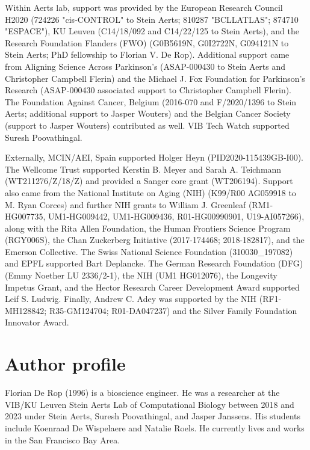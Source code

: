 Within Aerts lab, support was provided by the European Research Council H2020 (724226 "cis-CONTROL" to Stein Aerts; 810287 "BCLLATLAS"; 874710 "ESPACE"), KU Leuven (C14/18/092 and C14/22/125 to Stein Aerts), and the Research Foundation Flanders (FWO) (G0B5619N, G0I2722N, G094121N to Stein Aerts; PhD fellowship to Florian V. De Rop). Additional support came from Aligning Science Across Parkinson's (ASAP-000430 to Stein Aerts and Christopher Campbell Flerin) and the Michael J. Fox Foundation for Parkinson's Research (ASAP-000430 associated support to Christopher Campbell Flerin). The Foundation Against Cancer, Belgium (2016-070 and F/2020/1396 to Stein Aerts; additional support to Jasper Wouters) and the Belgian Cancer Society (support to Jasper Wouters) contributed as well. VIB Tech Watch supported Suresh Poovathingal.

\begingroup
{}
Externally, MCIN/AEI, Spain supported Holger Heyn (PID2020-115439GB-I00). The Wellcome Trust supported Kerstin B. Meyer and Sarah A. Teichmann (WT211276/Z/18/Z) and provided a Sanger core grant (WT206194). Support also came from the National Institute on Aging (NIH) (K99/R00 AG059918 to M. Ryan Corces) and further NIH grants to William J. Greenleaf (RM1-HG007735, UM1-HG009442, UM1-HG009436, R01-HG00990901, U19-AI057266), along with the Rita Allen Foundation, the Human Frontiers Science Program (RGY006S), the Chan Zuckerberg Initiative (2017-174468; 2018-182817), and the Emerson Collective. The Swiss National Science Foundation (310030\_197082) and EPFL supported Bart Deplancke. The German Research Foundation (DFG) (Emmy Noether LU 2336/2-1), the NIH (UM1 HG012076), the Longevity Impetus Grant, and the Hector Research Career Development Award supported Leif S. Ludwig. Finally, Andrew C. Adey was supported by the NIH (RF1-MH128842; R35-GM124704; R01-DA047237) and the Silver Family Foundation Innovator Award.
\endgroup

\chapter*{Author profile}
Florian De Rop (1996) is a bioscience engineer. He was a researcher at the VIB/KU Leuven Stein Aerts Lab of Computational Biology between 2018 and 2023 under Stein Aerts, Suresh Poovathingal, and Jasper Janssens. His students include Koenraad De Wispelaere and Natalie Roels. He currently lives and works in the San Francisco Bay Area.

